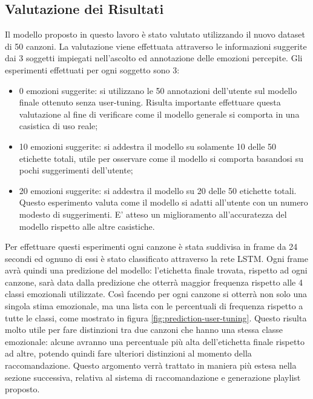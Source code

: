 \documentclass[11pt]{report}
\begin{document}
\subsection{Valutazione dei Risultati}


Il modello proposto in questo lavoro è stato valutato utilizzando il nuovo dataset di 50 canzoni. La valutazione viene effettuata attraverso le informazioni suggerite dai 3 soggetti impiegati nell'ascolto ed annotazione delle emozioni percepite. Gli esperimenti effettuati per ogni soggetto sono 3:
\begin{itemize}
    \item 0 emozioni suggerite: si utilizzano le 50 annotazioni dell'utente sul modello finale ottenuto senza user-tuning. Risulta importante effettuare questa valutazione al fine di verificare come il modello generale si comporta in una casistica di uso reale;
    
    \item 10 emozioni suggerite: si addestra il modello su solamente 10 delle 50 etichette totali, utile per osservare come il modello si comporta basandosi su pochi suggerimenti dell'utente;
    
    \item 20 emozioni suggerite: si addestra il modello su 20 delle 50 etichette totali. Questo esperimento valuta come il modello si adatti all'utente con un numero modesto di suggerimenti. E' atteso un miglioramento all'accuratezza del modello rispetto alle altre casistiche.
\end{itemize}

Per effettuare questi esperimenti ogni canzone è stata suddivisa in frame da 24 secondi ed ognuno di essi è stato classificato attraverso la rete LSTM. Ogni frame avrà quindi una predizione del modello: l'etichetta finale trovata, rispetto ad ogni canzone, sarà data dalla predizione che otterrà maggior frequenza rispetto alle 4 classi emozionali utilizzate. Così facendo per ogni canzone si otterrà non solo una singola stima emozionale, ma una lista con le percentuali di frequenza rispetto a tutte le classi, come mostrato in figura \ref{fig:prediction-user-tuning}. Questo risulta molto utile per fare distinzioni tra due canzoni che hanno una stessa classe emozionale: alcune avranno una percentuale più alta dell'etichetta finale rispetto ad altre, potendo quindi fare ulteriori distinzioni al momento della raccomandazione. Questo argomento verrà trattato in maniera più estesa nella sezione successiva, relativa al sistema di raccomandazione e generazione playlist proposto.
\end{document}
